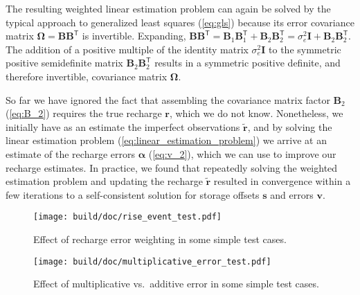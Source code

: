 \documentclass[11pt,a4paper]{article}
\renewcommand{\vec}[1]{\mathbf{#1}}
\begin{document}
The resulting weighted linear estimation problem can again be solved
by the typical approach to generalized least squares (\ref{eq:gls})
because its error covariance matrix
$\bm\Omega = \vec{B}\vec{B}^\mathsf{T}$ is invertible.  Expanding,
$\vec{B}\vec{B}^\mathsf{T} = \vec{B}_1\vec{B}_1^\mathsf{T} +
\vec{B}_2\vec{B}_2^\mathsf{T} = \sigma_e^2\vec{I} +
\vec{B}_2\vec{B}_2^\mathsf{T}$.  The addition of a positive multiple of
the identity matrix $\sigma_e^2\vec{I}$ to the symmetric positive
semidefinite matrix $\vec{B}_2\vec{B}_2^\mathsf{T}$ results in a
symmetric positive definite, and therefore invertible, covariance
matrix $\bm\Omega$.

So far we have ignored the fact that assembling the covariance matrix
factor $\vec{B}_2$ (\ref{eq:B_2}) requires the true recharge
$\vec{r}$, which we do not know.  Nonetheless, we initially have as an
estimate the imperfect observations $\tilde{\vec{r}}$, and by solving
the linear estimation problem (\ref{eq:linear_estimation_problem}) we
arrive at an estimate of the recharge errors $\bm\alpha$
(\ref{eq:v_2}), which we can use to improve our recharge estimates.
In practice, we found that repeatedly solving the weighted estimation
problem and updating the recharge $\tilde{\vec{r}}$ resulted in
convergence within a few iterations to a self-consistent solution for
storage offsets $\vec{s}$ and errors $\vec{v}$.

\begin{figure}[t!]
  \centerline{\texttt{[image: build/doc/rise\_event\_test.pdf]}}
  \caption{Effect of recharge error weighting in some simple test cases.}
  \label{fig:rise_event_test}
\end{figure}

\begin{figure}[t!]
  \centerline{\texttt{[image: build/doc/multiplicative\_error\_test.pdf]}}
  \caption{Effect of multiplicative vs.\ additive error in some simple
    test cases.}
  \label{fig:multiplicative_error_test}
\end{figure}
\end{document}
